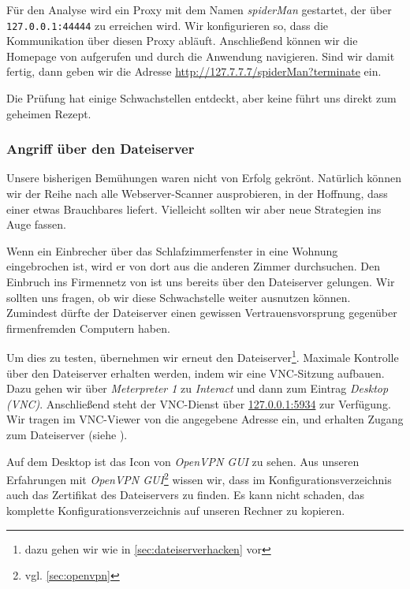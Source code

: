 
Für den Analyse wird ein Proxy mit dem Namen \emph{spiderMan} gestartet, der
über \texttt{127.0.0.1:44444} zu erreichen wird. Wir konfigurieren \Firefox{}
so, dass die Kommunikation über diesen Proxy abläuft. Anschließend können wir
die Homepage von \Mayerbrot{} aufgerufen und durch die Anwendung
navigieren. Sind wir damit fertig, dann geben wir die Adresse
\url{http://127.7.7.7/spiderMan?terminate} ein.

Die Prüfung hat einige Schwachstellen entdeckt, aber keine führt uns direkt zum
geheimen Rezept.


\subsubsection{Angriff über den Dateiserver}

Unsere bisherigen Bemühungen waren nicht von Erfolg gekrönt. Natürlich können
wir der Reihe nach alle Webserver-Scanner ausprobieren, in der Hoffnung, dass
einer etwas Brauchbares liefert. Vielleicht sollten wir aber neue Strategien ins
Auge fassen.

Wenn ein Einbrecher über das Schlafzimmerfenster in eine Wohnung eingebrochen
ist, wird er von dort aus die anderen Zimmer durchsuchen. Den Einbruch ins
Firmennetz von \Mayerbrot{} ist uns bereits über den Dateiserver gelungen. Wir
sollten uns fragen, ob wir diese Schwachstelle weiter ausnutzen
können. Zumindest dürfte der Dateiserver einen gewissen Vertrauensvorsprung
gegenüber firmenfremden Computern haben.

Um dies zu testen, übernehmen wir erneut den Dateiserver\footnote{dazu gehen wir
  wie in \cref{sec:dateiserverhacken} vor}. Maximale Kontrolle über den
Dateiserver erhalten werden, indem wir eine VNC-Sitzung aufbauen. Dazu gehen wir
über \emph{Meterpreter 1} zu \emph{Interact} und dann zum Eintrag \emph{Desktop
  (VNC)}. Anschließend steht der VNC-Dienst über \url{127.0.0.1:5934} zur
Verfügung. Wir tragen im VNC-Viewer von \Metasploit{} die angegebene Adresse
ein, und erhalten Zugang zum Dateiserver (siehe ).


Auf dem Desktop ist das Icon von \emph{OpenVPN GUI} zu sehen. Aus unseren
Erfahrungen mit \emph{OpenVPN GUI}\footnote{vgl. \cref{sec:openvpn}} wissen wir,
dass im Konfigurationsverzeichnis auch das Zertifikat des Dateiservers zu
finden. Es kann nicht schaden, das komplette Konfigurationsverzeichnis auf
unseren Rechner zu kopieren.

